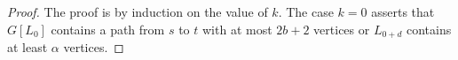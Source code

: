 \documentclass{patmorin}
\DeclareMathOperator{\depth}{depth}
\DeclareMathOperator{\pth}{path}
\begin{document}
\begin{proof}
  The proof is by induction on the value of $k$.  The case $k=0$ asserts that $G[L_0]$ contains a path from $s$ to $t$ with at most $2b+2$ vertices or $L_{0+d}$ contains at least $\alpha$ vertices.

\end{proof}









%


%
%
\end{document}
